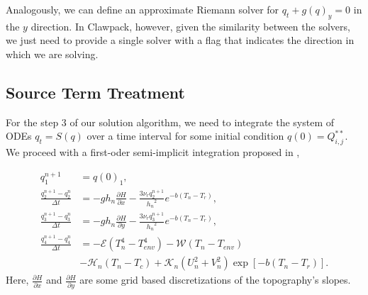 \documentclass[12pt]{article}
\begin{document}
Analogously, we can define an approximate Riemann solver for  $q_t+g(q)_y=0$ in the $y$ direction. 
In Clawpack, however, given the similarity between the solvers, we just need to provide a single solver with a flag that indicates the direction in which we are solving.

\subsection{Source Term Treatment}
For the step 3 of our solution algorithm, we need to integrate the system of ODEs $q_t=S(q)$ over a time interval for some initial condition $q(0)=Q^{**}_{i,j}$. 
We proceed with a first-oder semi-implicit integration proposed in \cite{monthe1999positivity},

\begin{align}
    q^{n+1}_1&=q(0)_1,\\
    \frac{q^{n+1}_2-q^{n}_2}{\Delta t}&=-gh_n \frac{\partial H}{\partial x}-\frac{3\nu_r q^{n+1}_2}{{h_n}^2}e^{-b(T_n-T_r)},\\
    \frac{q^{n+1}_3-q^{n}_3}{\Delta t}&=-gh_n \frac{\partial H}{\partial y}-\frac{3\nu_r q^{n+1}_3}{{h_n}^2}e^{-b(T_n-T_r)},\\
    \frac{q^{n+1}_4-q^{n}_4}{\Delta t}&=-\mathcal{E}\left(T_n^{4}-T_{e n v}^{4}\right)-\mathcal{W}\left(T_n-T_{e n v}\right)\\
    &-\mathcal{H}_n\left(T_n-T_{c}\right)+\mathcal{K}_n \left(U_n^{2}+V_n^{2}\right) \exp \left[-b\left(T_n-T_{r}\right)\right]. 
\end{align}
Here, $\frac{\partial H}{\partial x}$ and $\frac{\partial H}{\partial y}$ are some grid based discretizations of the topography's slopes. 
\end{document}
